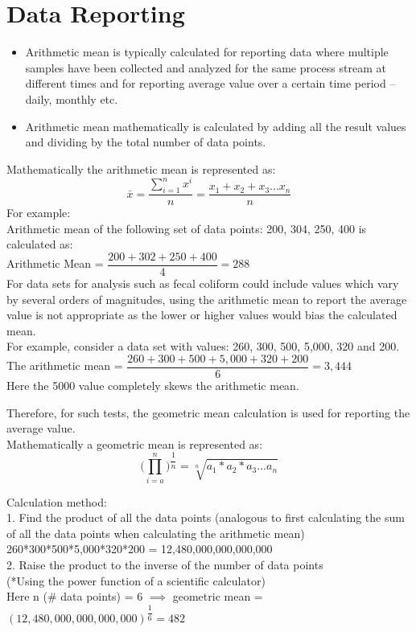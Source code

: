 \section{Data Reporting}	
		\begin{itemize}
			\item Arithmetic mean is typically calculated for reporting data where multiple samples have been collected and analyzed for the same process stream at different times and for reporting average value over a certain time period – daily, monthly etc.\\ \item Arithmetic mean mathematically is calculated by adding all the result values and dividing by the total number of data points.\\
		\end{itemize}
		Mathematically the arithmetic mean is represented as:\\
		$$\bar{x}=\dfrac{\sum_{i=1}^{n} x^i}{n} = \dfrac{x_1+x_2+x_3...x_n}{n}$$
		For example:\\
		Arithmetic mean of the following set of data points:  200, 304, 250, 400 is calculated as:\\
		\vspace{10pt}
		Arithmetic Mean = $\dfrac{200 + 302 + 250 + 400}{4}= 288$\\
		\vspace{10pt}
		For data sets for analysis such as fecal coliform could include values which vary by several orders of magnitudes, using the arithmetic mean to report the average value is not appropriate as the lower or higher values would bias the calculated mean.\\
		\vspace{10pt}
		For example, consider a data set with values:  260, 300, 500, 5,000, 320 and 200.\\
		\vspace{10pt}
		The arithmetic mean = $\dfrac{260+300+500+5,000+320+200}{6} = 3,444$\\
		Here the 5000 value completely skews the arithmetic mean.
		
		Therefore, for such tests, the geometric mean calculation is used for reporting the average value.\\
		
		
		Mathematically a geometric mean is represented as:\\
		$$\Bigg(\prod_{i=a}^n\Bigg)^{\dfrac{1}{n}}=\sqrt[n]{a_1*a_2*a_3...a_n}$$
		 
		Calculation method:\\
		1.	Find the product of all the data points (analogous to first calculating the sum of all the data points when calculating the arithmetic mean)\\
		260*300*500*5,000*320*200 = 12,480,000,000,000,000\\
		2.	Raise the product to the inverse of the number of data points\\
		(*Using the power function of a scientific calculator)\\
		Here n (\# data points) = 6 $\implies$ geometric mean = $(12,480,000,000,000,000)^{\dfrac{1}{6}}   = 482$

